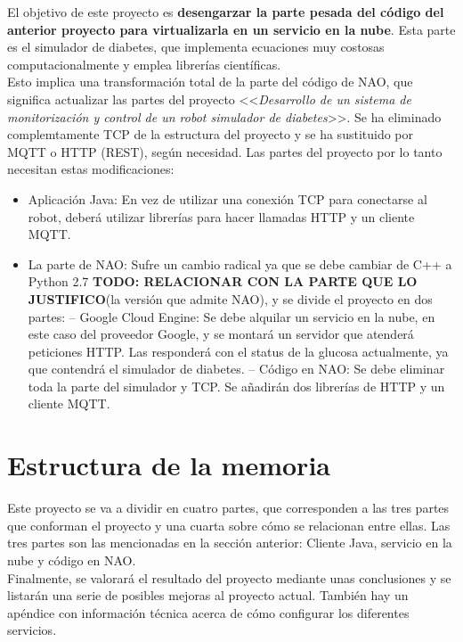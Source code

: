 \documentclass[12pt,spanish,listoffigures,listoftables]{tfgetsinf}
\begin{document}
El objetivo de este proyecto es \textbf{desengarzar la parte pesada del código del anterior proyecto para virtualizarla en un servicio en la nube}. Esta parte es el simulador de diabetes, que implementa ecuaciones muy costosas computacionalmente y emplea librerías científicas. \\

Esto implica una transformación total de la parte del código de NAO, que significa actualizar las partes del proyecto <<\textit{Desarrollo de un sistema de monitorización y control de un robot simulador de diabetes}>>. Se ha eliminado complemtamente TCP de la estructura del proyecto y se ha sustituido por MQTT o HTTP (REST), según necesidad. Las partes del proyecto por lo tanto necesitan estas modificaciones: 
\begin{itemize}
	\item Aplicación Java: En vez de utilizar una conexión TCP para conectarse al robot, deberá utilizar librerías para hacer llamadas HTTP y un cliente MQTT. 
	\item La parte de NAO: Sufre un cambio radical ya que se debe cambiar de C++ a Python 2.7 \textbf{TODO: RELACIONAR CON LA PARTE QUE LO JUSTIFICO}(la versión que admite NAO), y se divide el proyecto en dos partes:
		\subitem -- Google Cloud Engine: Se debe alquilar un servicio en la nube, en este caso del proveedor Google, y se montará un servidor que atenderá peticiones HTTP. Las responderá con el status de la glucosa actualmente, ya que contendrá el simulador de diabetes.
		\subitem -- Código en NAO: Se debe eliminar toda la parte del simulador y TCP. Se añadirán dos librerías de HTTP y un cliente MQTT. 
\end{itemize}

\section{Estructura de la memoria}

Este proyecto se va a dividir en cuatro partes, que corresponden a las tres partes que conforman el proyecto y una cuarta sobre cómo se relacionan entre ellas. Las tres partes son las mencionadas en la sección anterior: Cliente Java, servicio en la nube y código en NAO. \\

Finalmente, se valorará el resultado del proyecto mediante unas conclusiones y se listarán una serie de posibles mejoras al proyecto actual. También hay un apéndice con información técnica acerca de cómo configurar los diferentes servicios.
\end{document}
